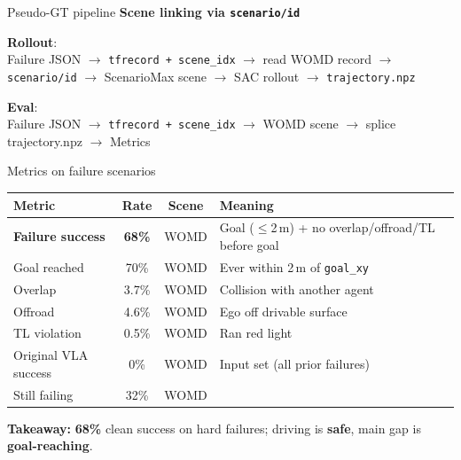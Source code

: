 \documentclass[aspectratio=169,11pt]{beamer}
\newcommand{\womdsucc}{\textbf{68\%}}
\begin{document}
\begin{frame}{Pseudo-GT pipeline}
  {\large\bfseries Scene linking via \texttt{scenario/id}}

  \vspace{0.8em}
  \textbf{Rollout}:\\[0.35em]
  Failure JSON $\rightarrow$ \texttt{tfrecord + scene_idx}
  $\rightarrow$ read WOMD record $\rightarrow$ \texttt{scenario/id}
  $\rightarrow$ ScenarioMax scene $\rightarrow$ SAC rollout $\rightarrow$ \texttt{trajectory.npz}

  \vspace{0.9em}
  \textbf{Eval}:\\[0.35em]
  Failure JSON $\rightarrow$ \texttt{tfrecord + scene_idx}
  $\rightarrow$ WOMD scene $\rightarrow$ splice trajectory.npz $\rightarrow$ Metrics
\end{frame}

\begin{frame}{Metrics on failure scenarios}
  \begin{table}
    \centering
    \small
    \begin{tabular}{@{}lccp{5.4cm}@{}}
      \toprule
      Metric & Rate & Scene & Meaning \\
      \midrule
      \textbf{Failure success} & \womdsucc{} & WOMD &
        Goal ($\leq$2\,m) + no overlap/offroad/TL before goal \\
      Goal reached & 70\% & WOMD & Ever within 2\,m of \texttt{goal\_xy} \\
      Overlap & 3.7\% & WOMD & Collision with another agent \\
      Offroad & 4.6\% & WOMD & Ego off drivable surface \\
      TL violation & 0.5\% & WOMD & Ran red light \\
      \midrule
      Original VLA success & 0\% & WOMD & Input set (all prior failures) \\
      Still failing & 32\% & WOMD & \\
      \bottomrule
    \end{tabular}
  \end{table}

  \vspace{0.3em}
  \textbf{Takeaway:} \womdsucc{} clean success on hard failures; driving is \textbf{safe}, main gap is \textbf{goal-reaching}.
\end{frame}
\end{document}

